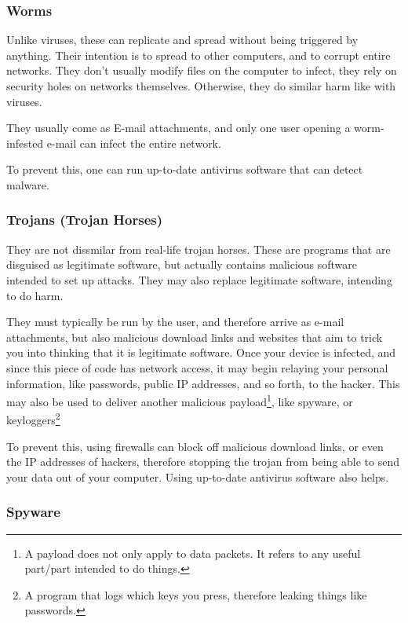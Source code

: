 \documentclass[../main.tex]{subfiles}
\begin{document}
\subsubsection{Worms}

Unlike viruses, these can replicate and spread without being triggered by anything. Their intention is to spread to other computers, and to corrupt entire networks. They don't usually modify files on the computer to infect, they rely on security holes on networks themselves. Otherwise, they do similar harm like with viruses.

They usually come as E-mail attachments, and only one user opening a worm-infested e-mail can infect the entire network.

To prevent this, one can run up-to-date antivirus software that can detect malware.

\subsubsection{Trojans (Trojan Horses)}

They are not dissmilar from real-life trojan horses. These are programs that are disguised as legitimate software, but actually contains malicious software intended to set up attacks. They may also replace legitimate software, intending to do harm.

They must typically be run by the user, and therefore arrive as e-mail attachments, but also malicious download links and websites that aim to trick you into thinking that it is legitimate software. Once your device is infected, and since this piece of code has network access, it may begin relaying your personal information, like passwords, public IP addresses, and so forth, to the hacker. This may also be used to deliver another malicious payload\footnote{A payload does not only apply to data packets. It refers to any useful part/part intended to do things.}, like spyware, or keyloggers\footnote{A program that logs which keys you press, therefore leaking things like passwords.}

To prevent this, using firewalls can block off malicious download links, or even the IP addresses of hackers, therefore stopping the trojan from being able to send your data out of your computer. Using up-to-date antivirus software also helps.

\subsubsection{Spyware}
\end{document}
